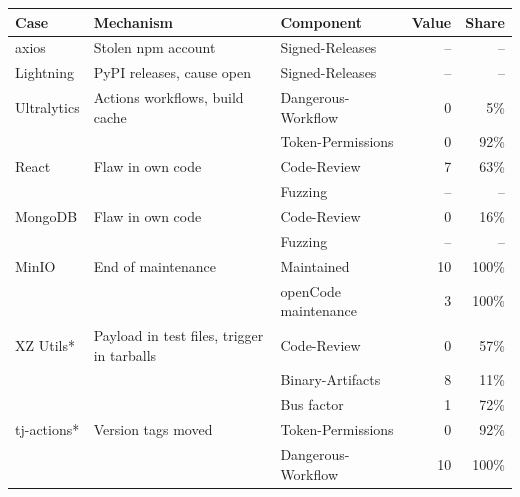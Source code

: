 \setlength{\tabcolsep}{3pt}
\begin{tabular}{>{\raggedright\arraybackslash}p{2.6cm}>{\raggedright\arraybackslash}p{4.4cm}>{\raggedright\arraybackslash}p{4.6cm}rr}
\toprule
Case & Mechanism & Component & Value & Share \\
\midrule
axios & Stolen npm account & Signed-Releases & -- & -- \\
\addlinespace[2pt]
Lightning & PyPI releases, cause open & Signed-Releases & -- & -- \\
\addlinespace[2pt]
Ultralytics & Actions workflows, build cache & Dangerous-Workflow & 0 & 5\% \\
 &  & Token-Permissions & 0 & 92\% \\
\addlinespace[2pt]
React & Flaw in own code & Code-Review & 7 & 63\% \\
 &  & Fuzzing & -- & -- \\
\addlinespace[2pt]
MongoDB & Flaw in own code & Code-Review & 0 & 16\% \\
 &  & Fuzzing & -- & -- \\
\addlinespace[2pt]
MinIO & End of maintenance & Maintained & 10 & 100\% \\
 &  & openCode maintenance & 3 & 100\% \\
\addlinespace[2pt]
XZ Utils* & Payload in test files, trigger in tarballs & Code-Review & 0 & 57\% \\
 &  & Binary-Artifacts & 8 & 11\% \\
 &  & Bus factor & 1 & 72\% \\
\addlinespace[2pt]
tj-actions* & Version tags moved & Token-Permissions & 0 & 92\% \\
 &  & Dangerous-Workflow & 10 & 100\% \\
\bottomrule
\end{tabular}
